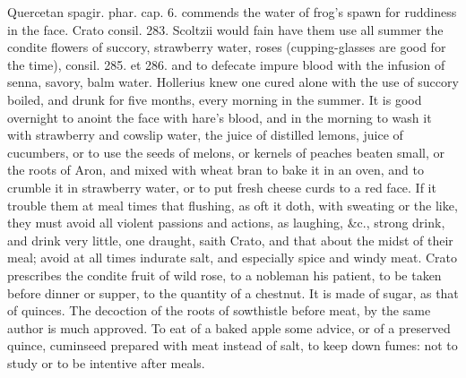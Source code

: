 Quercetan spagir. phar. cap. 6.
commends the water of frog's spawn for ruddiness in the face.
Crato consil. 283. Scoltzii would fain have them use all summer
the condite flowers of succory, strawberry water, roses
(cupping-glasses are good for the time), consil. 285. et 286. and to
defecate impure blood with the infusion of senna, savory, balm water.
Hollerius knew one cured alone with the use of succory boiled,
and drunk for five months, every morning in the summer. It is
good overnight to anoint the face with hare's blood, and in the morning
to wash it with strawberry and cowslip water, the juice of distilled
lemons, juice of cucumbers, or to use the seeds of melons, or kernels
of peaches beaten small, or the roots of Aron, and mixed with wheat
bran to bake it in an oven, and to crumble it in strawberry water,
 or to put fresh cheese curds to a red face.
If it trouble them at meal times that flushing, as oft it doth, with
sweating or the like, they must avoid all violent passions and actions,
as laughing, \&c., strong drink, and drink very little, one
draught, saith Crato, and that about the midst of their meal; avoid at
all times indurate salt, and especially spice and windy meat.
Crato prescribes the condite fruit of wild rose, to a nobleman
his patient, to be taken before dinner or supper, to the quantity of a
chestnut. It is made of sugar, as that of quinces. The decoction of the
roots of sowthistle before meat, by the same author is much approved.
To eat of a baked apple some advice, or of a preserved quince,
cuminseed prepared with meat instead of salt, to keep down fumes: not
to study or to be intentive after meals.

